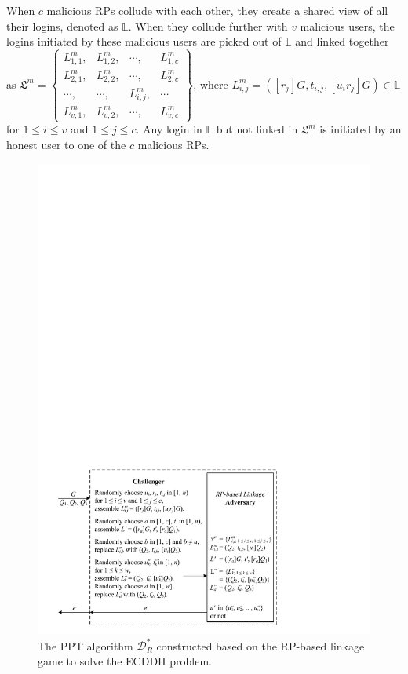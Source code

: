 
When $c$ malicious RPs collude with each other, they create a shared view of all their logins, denoted as $\mathbb{L}$.
When they collude further with $v$ malicious users, the logins initiated by these malicious users are picked out of $\mathbb{L}$ and linked together as
$\mathfrak{L}^m=\left \{ \begin{matrix}
L^m_{1,1},&L^m_{1,2},&\cdots,&L^m_{1,c}\\
L^m_{2,1},& L^m_{2,2},&\cdots,&L^m_{2,c}\\
\cdots,&\cdots,&L^m_{i,j},&\cdots\\
L^m_{v,1},&L^m_{v,2},&\cdots,&L^m_{v,c}
\end{matrix}\right\}$,
where $L^m_{i, j}=([r_j]G, t_{i,j}, [u_ir_j]G) \in \mathbb{L}$ for $1 \le i \le v$ and $1 \le j \le c$. Any login in $\mathbb{L}$ but not linked in $\mathfrak{L}^m$ is initiated by an honest user to one of the $c$ malicious RPs.

\begin{figure}[tb]
  \centering
  \includegraphics[width=1.0\linewidth]{fig/rp-linkage-game.pdf}
  \caption{The PPT algorithm $\mathcal{D}^*_R$ constructed based on the RP-based linkage game to solve the ECDDH problem.}
  \label{fig:dalgorithm}
\end{figure}


